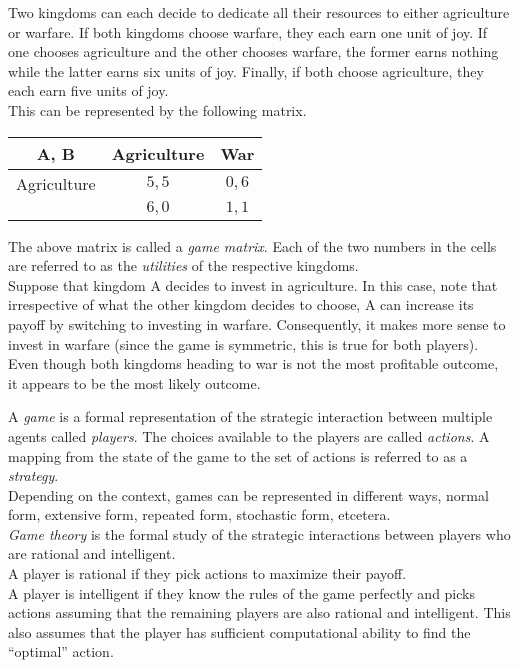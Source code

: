 \begin{fex}
	Two kingdoms can each decide to dedicate all their resources to either agriculture or warfare. If both kingdoms choose warfare, they each earn one unit of joy. If one chooses agriculture and the other chooses warfare, the former earns nothing while the latter earns six units of joy. Finally, if both choose agriculture, they each earn five units of joy.\\
	This can be represented by the following matrix.

	\begin{center}
	\begin{tabular}{|c||c|c|}
		\hline
		A, B & \textsf{Agriculture} & \textsf{War} \\
		\hline\hline
		\textsf{Agriculture} & $5, 5$ & $0, 6$ \\
		\hline
		\sf{War} & $6, 0$ & $1, 1$ \\
		\hline
	\end{tabular}
	\end{center}

	The above matrix is called a \emph{game matrix}. Each of the two numbers in the cells are referred to as the \emph{utilities} of the respective kingdoms.\\
	Suppose that kingdom A decides to invest in agriculture. In this case, note that irrespective of what the other kingdom decides to choose, A can increase its payoff by switching to investing in warfare. Consequently, it makes more sense to invest in warfare (since the game is symmetric, this is true for both players). Even though both kingdoms heading to war is not the most profitable outcome, it appears to be the most likely outcome.\\
\end{fex}

A \emph{game} is a formal representation of the strategic interaction between multiple agents called \emph{players}.
The choices available to the players are called \emph{actions}. A mapping from the state of the game to the set of actions is referred to as a \emph{strategy}.\\
Depending on the context, games can be represented in different ways, normal form, extensive form, repeated form, stochastic form, etcetera.\\

\emph{Game theory} is the formal study of the strategic interactions between players who are rational and intelligent.\\
A player is rational if they pick actions to maximize their payoff.\\
A player is intelligent if they know the rules of the game perfectly and picks actions assuming that the remaining players are also rational and intelligent. This also assumes that the player has sufficient computational ability to find the ``optimal'' action.\\

